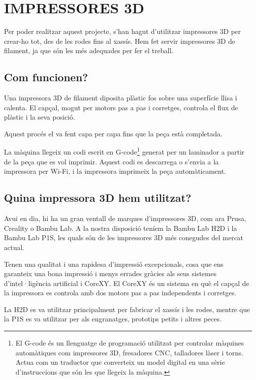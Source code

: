 \documentclass[11pt,a4paper]{article}
\let\origsection\section
\renewcommand{\section}{\clearpage\origsection}
\begin{document}
\section{IMPRESSORES 3D}

Per poder realitzar aquest projecte, s’han hagut d’utilitzar impressores 3D per crear-ho tot, des de les rodes fins al xassís. Hem fet servir impressores 3D de filament, ja que són les més adequades per fer el treball.

\subsection{Com funcionen?}

Una impressora 3D de filament diposita plàstic fos sobre una superfície llisa i calenta. El capçal, mogut per motors pas a pas i corretges, controla el flux de plàstic i la seva posició.

Aquest procés el va fent capa per capa fins que la peça està completada.

La màquina llegeix un codi escrit en G-code\footnote{El G-code és un llenguatge de programació utilitzat per controlar màquines automàtiques com impressores 3D, fresadores CNC, talladores làser i torns. Actua com un traductor que converteix un model digital en una sèrie d'instruccions que són les que llegeix la màquina.} generat per un laminador a partir de la peça que es vol imprimir. Aquest codi es descarrega o s’envia a la impressora per Wi-Fi, i la impressora imprimeix la peça automàticament.

\subsection{Quina impressora 3D hem utilitzat?}

Avui en dia, hi ha un gran ventall de marques d’impressores 3D, com ara Prusa, Creality o Bambu Lab. A la nostra disposició teníem la Bambu Lab H2D i la Bambu Lab P1S, les quals són de les impressores 3D més conegudes del mercat actual.

Tenen una qualitat i una rapidesa d’impressió excepcionals, cosa que ens garanteix una bona impressió i menys errades gràcies als seus sistemes d’intel·ligència artificial i CoreXY. El CoreXY és un sistema en què el capçal de la impressora es controla amb dos motors pas a pas independents i corretges.

La H2D es va utilitzar principalment per fabricar el xassís i les rodes, mentre que la P1S es va utilitzar per als engranatges, prototips petits i altres peces.
\end{document}
